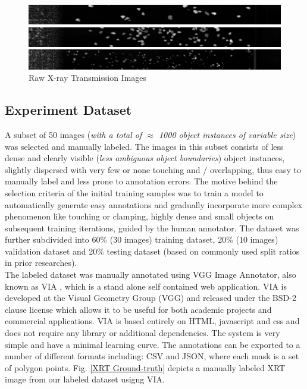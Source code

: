 \documentclass[conference]{IEEEtran}
\begin{document}
		\begin{figure}[htbp]
			\centering
			\includegraphics[width=1\linewidth]{scaled_CameraData20170505_150519_006199056_38672.jpg}
			
			\vspace{.1cm}
			
			\includegraphics[width=1\linewidth]{scaled_CameraData20170505_150519_006198940_38556.jpg}
			
			\vspace{.1cm}
			
			\includegraphics[width=1\linewidth]{scaled_CameraData20170505_131205_005799188_32020.jpg}
			\caption{ Raw X-ray Transmission Images}
			\label{XRT Image}
		\end{figure}
		
	\subsection{Experiment Dataset}
		
		A subset of 50 images (\textit{with a total of $\approx$ 1000 object instances of variable size}) was selected and manually labeled. The images in this subset
consists of less dense and clearly visible (\textit{less ambiguous object boundaries}) object instances, slightly dispersed with very few or none touching and / overlapping, thus easy
to manually label and less prone to annotation errors. The motive behind the selection criteria of the initial training samples was to train a model to automatically generate easy annotations and gradually incorporate more complex phenomenon like touching or
 clamping, highly dense and small objects on subsequent training iterations, guided by the human annotator. The dataset was further subdivided into 60\% (30 images) training dataset, 20\% (10 images) validation dataset and 20\% testing dataset (based on commonly
used split ratios in prior researches).\\
		
		The labeled dataset was manually annotated using VGG Image Annotator, also known as VIA \cite{Dutta}, which is a stand alone self contained web application. VIA is developed at the Visual Geometry Group (VGG) and released under the BSD-2 clause license which allows it to be useful for both academic projects and commercial applications. VIA is based entirely on HTML, javascript and css and does not require any library or additional dependencies. The system is very simple and have a minimal learning curve. The annotations can be exported to a number of different formats including: CSV and JSON, where each mask is a set of polygon points. Fig. \ref{XRT Ground-truth} depicts a manually labeled XRT image from our labeled dataset usigng VIA.
		
\end{document}
